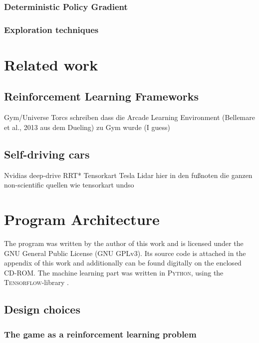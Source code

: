\subsection{Deterministic Policy Gradient}

\subsection{Exploration techniques}


\chapter{Related work}

\section{Reinforcement Learning Frameworks}

Gym/Universe
Torcs
schreiben dass die Arcade Learning Environment (Bellemare et al., 2013 aus dem Dueling) zu Gym wurde (I guess)

\section{Self-driving cars}

Nvidias deep-drive
RRT*
Tensorkart
Tesla
Lidar
hier in den fußnoten die ganzen non-scientific quellen wie tensorkart undso

\chapter{Program Architecture}


The program was written by the author of this work and is licensed under the GNU General Public License (GNU GPLv3). Its source code is attached in the appendix of this work and additionally can be found digitally on the enclosed CD-ROM. The machine learning part was written in \textsc{Python}, using the \textsc{Tensorflow}-library \parencite{abadi_tensorflow:_2015}.

\section{Design choices}

\subsection{The game as a reinforcement learning problem}

